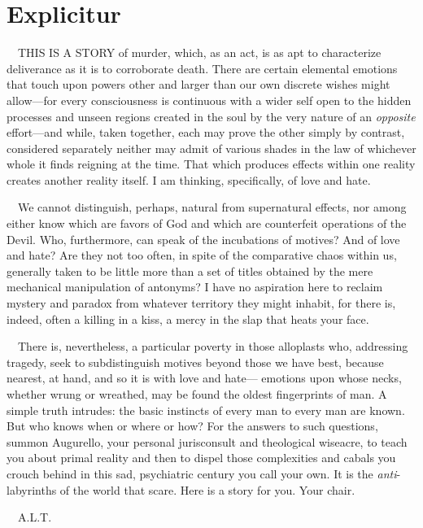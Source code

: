 \chapter*{Explicitur}
%

~~THIS IS A STORY of murder, which, as an act, is as apt to characterize
deliverance as it is to corroborate death. There are certain elemental
emotions that touch upon powers other and larger than our own discrete
wishes might allow---for every consciousness is continuous with a wider
self open to the hidden processes and unseen regions created in the soul
by the very nature of an \emph{opposite} effort---and while, taken
together, each may prove the other simply by contrast, considered
separately neither may admit of various shades in the law of whichever
whole it finds reigning at the time. That which produces effects within
one reality creates another reality itself. I am thinking, specifically,
of love and hate.

~~We cannot distinguish, perhaps, natural from supernatural effects, nor
among either know which are favors of God and which are counterfeit
operations of the Devil. Who, furthermore, can speak of the incubations
of motives? And of love and hate? Are they not too often, in spite of
the comparative chaos within us, generally taken to be little more than
a set of titles obtained by the mere mechanical manipulation of
antonyms? I have no aspiration here to reclaim mystery and paradox from
whatever territory they might inhabit, for there is, indeed, often a
killing in a kiss, a mercy in the slap that heats your face.

~~There is, nevertheless, a particular poverty in those alloplasts who,
addressing tragedy, seek to subdistinguish motives beyond those we have
best, because nearest, at hand, and so it is with love and hate---
emotions upon whose necks, whether wrung or wreathed, may be found the
oldest fingerprints of man. A simple truth intrudes: the basic instincts
of every man to every man are known. But who knows when or where or how?
For the answers to such questions, summon Augurello, your personal
jurisconsult and theological wiseacre, to teach you about primal reality
and then to dispel those complexities and cabals you crouch behind in
this sad, psychiatric century you call your own. It is the
\emph{anti}-labyrinths of the world that scare. Here is a story for you.
Your chair.

~~A.L.T.

